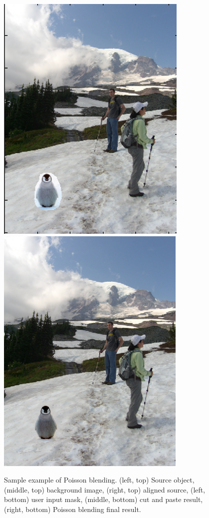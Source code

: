 \documentclass[11pt]{article}
\begin{document}
\begin{figure} [ht]
\begin{center}
\includegraphics[scale=0.44]{results_poisson/set1/im5.png}  
\includegraphics[scale=0.44]{results_poisson/set1/im6.png}   
\caption{Sample example of Poisson blending. (left, top) Source object, (middle, top) background image, (right, top) aligned source, (left, bottom) user input mask, (middle, bottom) cut and paste result, (right, bottom) Poisson blending final result.}
\label{1}
\end{center}
\end{figure}
\end{document}
